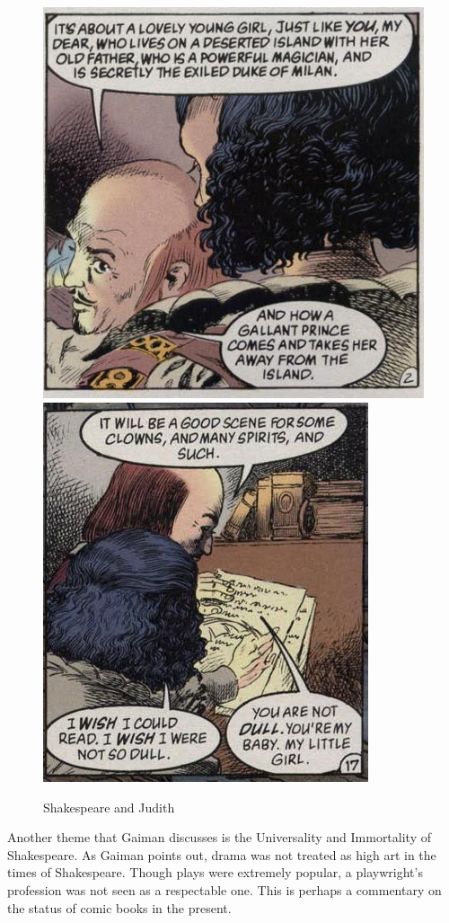 \documentclass{article}
\begin{document}
\begin{figure}[htp]
\begin{center}
  \centering
  \includegraphics[scale=0.6]{../Presentation/judith.jpg}
  \includegraphics[scale=0.6]{../Presentation/judith2.jpg}
\end{center}
\caption{Shakespeare and Judith}
\label{judith}
\end{figure}


Another theme that Gaiman discusses is the Universality and Immortality of Shakespeare. As Gaiman points out, drama was not treated as high art in the times of Shakespeare. Though plays were extremely popular, a playwright's profession was not seen as a respectable one. This is perhaps a commentary on the status of comic books in the present. 
\end{document}
